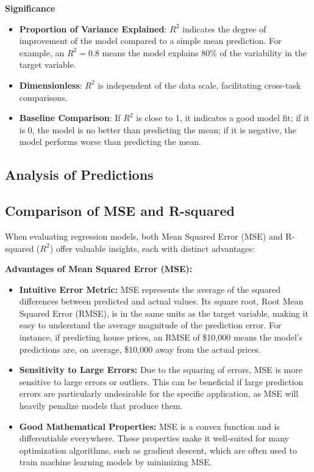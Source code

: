 \documentclass{article}
\begin{document}
\textbf{Significance}
\begin{itemize}
    \item \textbf{Proportion of Variance Explained}: $R^2$ indicates the degree of improvement of the model compared to a simple mean prediction. For example, an $R^2=0.8$ means the model explains 80\% of the variability in the target variable.
    \item \textbf{Dimensionless}: $R^2$ is independent of the data scale, facilitating cross-task comparisons.
    \item \textbf{Baseline Comparison}: If $R^2$ is close to 1, it indicates a good model fit; if it is 0, the model is no better than predicting the mean; if it is negative, the model performs worse than predicting the mean.
\end{itemize}



\subsection{Analysis of Predictions}
\label{ssec:analysis_preds}

\subsection*{Comparison of MSE and R-squared}

When evaluating regression models, both Mean Squared Error (MSE) and R-squared ($R^2$) offer valuable insights, each with distinct advantages:

\textbf{Advantages of Mean Squared Error (MSE):}
\begin{itemize}
    \item \textbf{Intuitive Error Metric:} MSE represents the average of the squared differences between predicted and actual values. Its square root, Root Mean Squared Error (RMSE), is in the same units as the target variable, making it easy to understand the average magnitude of the prediction error. For instance, if predicting house prices, an RMSE of \$10,000 means the model's predictions are, on average, \$10,000 away from the actual prices.
    \item \textbf{Sensitivity to Large Errors:} Due to the squaring of errors, MSE is more sensitive to large errors or outliers. This can be beneficial if large prediction errors are particularly undesirable for the specific application, as MSE will heavily penalize models that produce them.
    \item \textbf{Good Mathematical Properties:} MSE is a convex function and is differentiable everywhere. These properties make it well-suited for many optimization algorithms, such as gradient descent, which are often used to train machine learning models by minimizing MSE.
\end{itemize}
\end{document}
